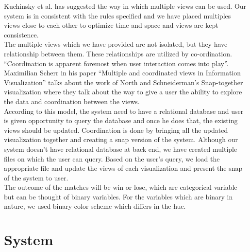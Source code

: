 \documentclass[10pt,journal,compsoc]{IEEEtran}
\begin{document}
\indent Kuchinsky et al. \cite{multipleviews} has suggested the way in which multiple views can be used. Our system is in consistent with the rules specified and we have placed multiples views close to each other to optimize time and space and views are kept consistence.\\

\indent The multiple views which we have provided are not isolated, but they have relationship between them. These relationships are utilized by co-ordination. ``Coordination is apparent foremost when user interaction comes into play''.\cite{multipleviews2} Maximilian Scherr in his paper ``Multiple and coordinated views in Information Visualization''\cite{multipleviews2} talks about the work of North and Schneiderman’s Snap-together visualization\cite{snap} where they talk about the way to give a user the ability to explore the data and coordination between the views.\\ 

\indent According to this model, the system need to have a relational database and user is given opportunity to query the database and once he does that, the existing views should be updated. Coordination is done by bringing all the updated visualization together and creating a snap version of the system. Although our system doesn't have relational database at back end, we have created multiple files on which the user can query. Based on the user's query, we load the appropriate file and update the views of each visualization and present the snap of the system to user.\\

\indent The outcome of the matches will be win or lose, which are categorical variable but can be thought of binary variables. For the variables which are binary in nature, we used binary color scheme which differs in the hue.\cite{colorscheme}


\section {System}
\end{document}
